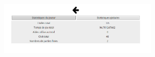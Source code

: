 \documentclass[a4paper, 12pt]{report}
\begin{document}
            \begin{minipage}{\linewidth}
                    \centering
			        \includegraphics[width=8cm]{StatsGlobales.png}
	        \end{minipage}

		
		
\end{document}
